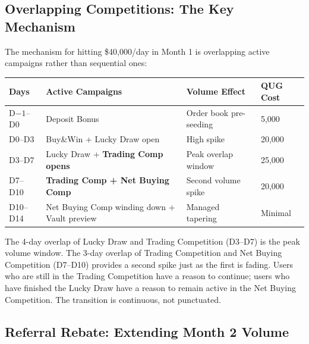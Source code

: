 \documentclass[11pt,a4paper]{article}
\begin{document}
\subsection{Overlapping Competitions: The Key Mechanism}

The mechanism for hitting \$40,000/day in Month 1 is overlapping active campaigns rather than sequential ones:

\begin{center}
\begin{tabular}{C{2cm} L{5.5cm} C{2.5cm} C{2cm}}
  \toprule
  \textbf{Days} & \textbf{Active Campaigns} & \textbf{Volume Effect} & \textbf{QUG Cost} \\
  \midrule
  D$-1$--D0 & Deposit Bonus & Order book pre-seeding & 5,000 \\
  D0--D3 & Buy\&Win + Lucky Draw open & High spike & 20,000 \\
  D3--D7 & Lucky Draw + \textbf{Trading Comp opens} & Peak overlap window & 25,000 \\
  D7--D10 & \textbf{Trading Comp + Net Buying Comp} & Second volume spike & 20,000 \\
  D10--D14 & Net Buying Comp winding down + Vault preview & Managed tapering & Minimal \\
  \bottomrule
\end{tabular}
\end{center}

The 4-day overlap of Lucky Draw and Trading Competition (D3--D7) is the peak volume window. The 3-day overlap of Trading Competition and Net Buying Competition (D7--D10) provides a second spike just as the first is fading. Users who are still in the Trading Competition have a reason to continue; users who have finished the Lucky Draw have a reason to remain active in the Net Buying Competition. The transition is continuous, not punctuated.

\subsection{Referral Rebate: Extending Month 2 Volume}
\end{document}

